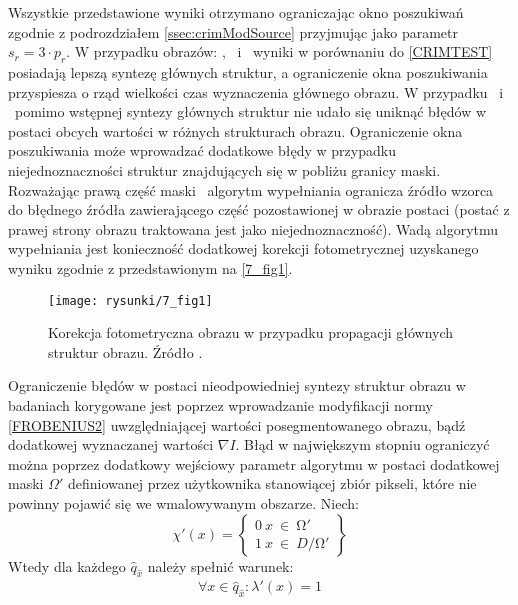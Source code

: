 \documentclass[12pt, twoside, openany]{report}
\theoremstyle{definition}
\begin{document}
Wszystkie przedstawione wyniki otrzymano ograniczając okno poszukiwań zgodnie z podrozdziałem \ref{ssec:crimModSource} przyjmując jako parametr $s_r = 3 \cdot 	p_r$. W przypadku obrazów: \ObrVIm , \ObrXVIIm \ i \ObrXIXm \ wyniki w porównaniu do \autoref{CRIMTEST} posiadają lepszą syntezę głównych struktur, a ograniczenie okna poszukiwania przyspiesza o rząd wielkości czas wyznaczenia głównego obrazu. W przypadku \ObrXVm \ i \ObrXIIIm \ pomimo wstępnej syntezy głównych struktur nie udało się uniknąć błędów w postaci obcych wartości w różnych strukturach obrazu. Ograniczenie okna poszukiwania może wprowadzać dodatkowe błędy w przypadku niejednoznaczności struktur znajdujących się w pobliżu granicy maski. Rozważając prawą część maski \ObrXVIIm \ algorytm wypełniania ogranicza źródło wzorca do błędnego źródła zawierającego część pozostawionej w obrazie postaci (postać z prawej strony obrazu traktowana jest jako niejednoznaczność). Wadą algorytmu wypełniania jest konieczność dodatkowej korekcji fotometrycznej uzyskanego wyniku zgodnie z \cite{StructurePropagationManual} przedstawionym na \autoref{7_fig1}. 
\begin{figure}[!h]
	\centering
	\texttt{[image: rysunki/7\_fig1]}
	\caption{Korekcja fotometryczna obrazu w przypadku propagacji głównych struktur obrazu. Źródło \cite{StructurePropagationManual}.}
	\label{7_fig1} 
\end{figure}
Ograniczenie błędów w postaci nieodpowiedniej syntezy struktur obrazu w badaniach korygowane jest poprzez wprowadzanie modyfikacji normy \eqref{FROBENIUS2} uwzględniającej wartości posegmentowanego obrazu, bądź dodatkowej wyznaczanej wartości $\nabla I$. Błąd w największym stopniu ograniczyć można poprzez dodatkowy wejściowy parametr algorytmu w postaci dodatkowej maski $\Omega '$ definiowanej przez użytkownika stanowiącej zbiór pikseli, które nie powinny pojawić się we wmalowywanym obszarze. Niech:
\begin{equation}
{\chi }'\left(x\right)=\left\{ \begin{array}{c}
0\ x\ \in \ \mathrm{\Omega }' \\ 
1\ x\ \in \ D/\mathrm{\Omega}' \end{array}
\right\}
\end{equation}
Wtedy dla każdego $\hat{q}_{\hat{x}}$ należy spełnić warunek:
\begin{align}
\forall x \in \hat{q}_{\hat{x}} : {\lambda }'(x) = 1
\end{align}
\end{document}
